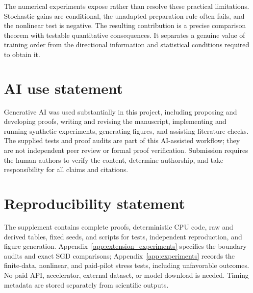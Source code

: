 \documentclass{article}
\theoremstyle{remark}\newtheorem{remark}[theorem]{Remark}
\begin{document}
The numerical experiments expose rather than resolve these practical limitations. Stochastic gains are conditional, the unadapted preparation rule often fails, and the nonlinear test is negative. The resulting contribution is a precise comparison theorem with testable quantitative consequences. It separates a genuine value of training order from the directional information and statistical conditions required to obtain it.
\label{main:end}

\clearpage
\section*{AI use statement}\label{sec:ai}
Generative AI was used substantially in this project, including proposing and developing proofs, writing and revising the manuscript, implementing and running synthetic experiments, generating figures, and assisting literature checks. The supplied tests and proof audits are part of this AI-assisted workflow; they are not independent peer review or formal proof verification. Submission requires the human authors to verify the content, determine authorship, and take responsibility for all claims and citations.

\section*{Reproducibility statement}
The supplement contains complete proofs, deterministic CPU code, raw and derived tables, fixed seeds, and scripts for tests, independent reproduction, and figure generation. Appendix~\ref{app:extension_experiments} specifies the boundary audits and exact SGD comparisons; Appendix~\ref{app:experiments} records the finite-data, nonlinear, and paid-pilot stress tests, including unfavorable outcomes. No paid API, accelerator, external dataset, or model download is needed. Timing metadata are stored separately from scientific outputs.


\clearpage
\appendix






\end{document}
